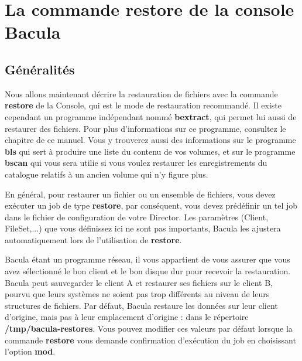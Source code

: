 
\chapter{La commande restore de la console Bacula}
\label{_ChapterStart13}

\section{G\'en\'eralit\'es}

Nous allons maintenant d\'ecrire la restauration de fichiers avec la commande
{\bf restore} de la Console, qui est le mode de restauration recommand\'e.
Il existe cependant un programme ind\'ependant nomm\'e {\bf bextract}, qui permet
lui aussi de restaurer des fichiers. Pour plus d'informations sur ce
programme, consultez le chapitre 
de ce manuel. Vous y trouverez aussi des informations sur le programme {\bf bls}
qui sert \`a produire une liste du contenu de vos volumes, et sur le programme
{\bf bscan} qui vous sera utilie si vous voulez restaurer les enregistrements
du catalogue relatifs \`a un ancien volume qui n'y figure plus.

En g\'en\'eral, pour restaurer un fichier ou un ensemble de fichiers, vous devez
ex\'ecuter un job de type {\bf restore}, par cons\'equent, vous devez pr\'ed\'efinir
un tel job dans le fichier de configuration de votre Director. Les param\`etres
(Client, FileSet,...) que vous d\'efinissez ici ne sont pas importants,
Bacula les ajustera automatiquement lors de l'utilisation de {\bf restore}.

Bacula \'etant un programme r\'eseau, il vous appartient de vous assurer que
vous avez s\'electionn\'e le bon client et le bon disque dur pour recevoir la
restauration. Bacula peut sauvegarder le client A et restaurer ses fichiers 
sur le client B, pourvu que leurs syst\`emes ne soient pas trop diff\'erents 
au niveau de leurs structures de fichiers. Par d\'efaut, Bacula restaure les 
donn\'ees sur leur client d'origine, mais pas \`a leur emplacement d'origine : 
dans le r\'epertoire {\bf /tmp/bacula-restores}. Vous pouvez modifier ces 
valeurs par d\'efaut lorsque la commande {\bf restore} vous demande confirmation 
d'ex\'ecution du job en choisissant l'option {\bf mod}.

